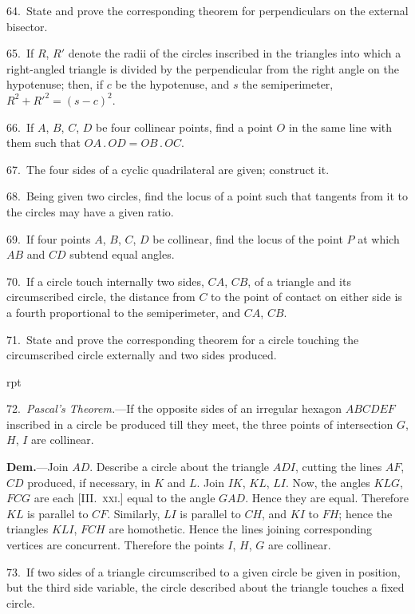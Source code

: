 \documentclass[oneside]{book}
\newcounter{wrapwidth}
\newcommand\imgflow[3]{
\setcounter{wrapwidth}{#1}

\begin{wrapfigure}[#2]{r}{\value{wrapwidth}pt}
\begin{center}
\vspace{-0.3in}

\end{center}
\end{wrapfigure}
}
\begin{document}
\begin{footnotesize}
64.~State and prove the corresponding theorem for perpendiculars
on the external bisector.

65.~If $R$, $R'$ denote the radii of the circles inscribed in the
triangles into which a right-angled triangle is divided by the perpendicular
from the right angle on the hypotenuse; then, if $c$ be
the hypotenuse, and $s$ the semiperimeter, $R^{2} + R'^{2} = (s-c)^{2}$.

66.~If $A$, $B$, $C$, $D$ be four collinear points, find a point $O$ in
the same line with them such that $OA\,.\,OD = OB\,.\,OC$.

67.~The four sides of a cyclic quadrilateral are given; construct
it.

68.~Being given two circles, find the locus of a point such
that tangents from it to the circles may have a given ratio.

69.~If four points $A$, $B$, $C$, $D$ be collinear, find the locus of the
point $P$ at which $AB$ and $CD$ subtend equal angles.

70.~If a circle touch internally two sides, $CA$, $CB$, of a triangle
and its circumscribed circle, the distance from $C$ to the point of
contact on either side is a fourth proportional to the semiperimeter,
and $CA$, $CB$.

71.~State and prove the corresponding theorem for a circle
touching the circumscribed circle externally and two sides produced.



\imgflow{170}{28}{f214}

72.~\emph{Pascal's Theorem.}---If the opposite sides of an irregular
hexagon $ABCDEF$ inscribed in a circle be produced till they
meet, the three points of intersection $G$, $H$, $I$ are collinear.

\textbf{Dem.}---Join $AD$. Describe a circle about the triangle $ADI$,
cutting the lines $AF$, $CD$ produced, if necessary, in $K$ and $L$.
Join $IK$, $KL$, $LI$. Now,
the angles $KLG$, $FCG$ are
each [III\@.~\textsc{xxi.}] equal to
the angle $GAD$. Hence they
are equal. Therefore $KL$ is
parallel to $CF$. Similarly,
$LI$ is parallel to $CH$, and
$KI$ to $FH$; hence the triangles
$KLI$, $FCH$ are homothetic.
Hence the lines
joining corresponding vertices
are concurrent. Therefore
the points $I$, $H$, $G$ are
collinear.

73.~If two sides of a triangle
circumscribed to a
given circle be given in
position, but the third side
variable, the circle described
about the triangle touches a
fixed circle.


\end{footnotesize}
\end{document}
